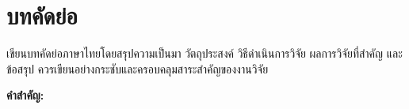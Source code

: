 \chapter*{บทคัดย่อ}

เขียนบทคัดย่อภาษาไทยโดยสรุปความเป็นมา วัตถุประสงค์ วิธีดำเนินการวิจัย
ผลการวิจัยที่สำคัญ และข้อสรุป ควรเขียนอย่างกระชับและครอบคลุมสาระสำคัญของงานวิจัย

\vspace{16pt}
\noindent\textbf{คำสำคัญ:} \keywordsTH
\clearpage
